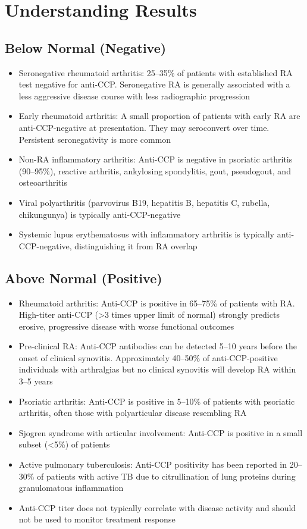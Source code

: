 \section*{Understanding Results}

\subsection*{Below Normal (Negative)}
\begin{itemize}
  \item Seronegative rheumatoid arthritis: 25--35\% of patients with established RA test negative for anti-CCP. Seronegative RA is generally associated with a less aggressive disease course with less radiographic progression
  \item Early rheumatoid arthritis: A small proportion of patients with early RA are anti-CCP-negative at presentation. They may seroconvert over time. Persistent seronegativity is more common
  \item Non-RA inflammatory arthritis: Anti-CCP is negative in psoriatic arthritis (90--95\%), reactive arthritis, ankylosing spondylitis, gout, pseudogout, and osteoarthritis
  \item Viral polyarthritis (parvovirus B19, hepatitis B, hepatitis C, rubella, chikungunya) is typically anti-CCP-negative
  \item Systemic lupus erythematosus with inflammatory arthritis is typically anti-CCP-negative, distinguishing it from RA overlap
\end{itemize}

\subsection*{Above Normal (Positive)}
\begin{itemize}
  \item Rheumatoid arthritis: Anti-CCP is positive in 65--75\% of patients with RA. High-titer anti-CCP (>3 times upper limit of normal) strongly predicts erosive, progressive disease with worse functional outcomes
  \item Pre-clinical RA: Anti-CCP antibodies can be detected 5--10 years before the onset of clinical synovitis. Approximately 40--50\% of anti-CCP-positive individuals with arthralgias but no clinical synovitis will develop RA within 3--5 years
  \item Psoriatic arthritis: Anti-CCP is positive in 5--10\% of patients with psoriatic arthritis, often those with polyarticular disease resembling RA
  \item Sjogren syndrome with articular involvement: Anti-CCP is positive in a small subset (<5\%) of patients
  \item Active pulmonary tuberculosis: Anti-CCP positivity has been reported in 20--30\% of patients with active TB due to citrullination of lung proteins during granulomatous inflammation
  \item Anti-CCP titer does not typically correlate with disease activity and should not be used to monitor treatment response
\end{itemize}

